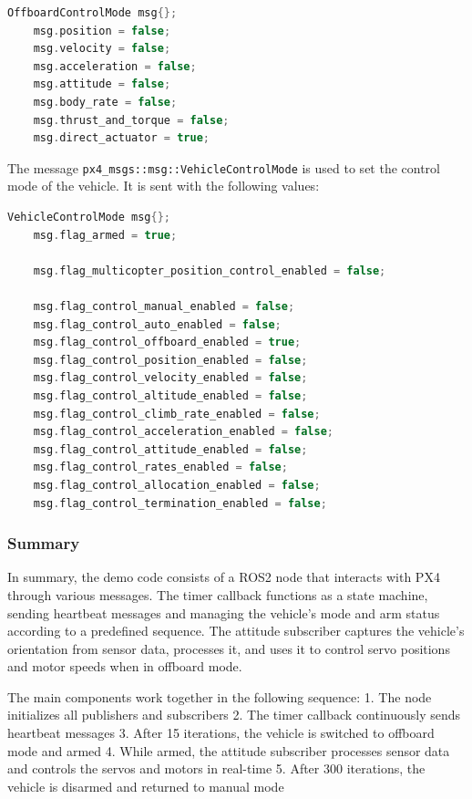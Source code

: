\documentclass[a4paper]{article}
\begin{document}
\begin{lstlisting}[language=C++, caption=OffboardControlMode message]
	OffboardControlMode msg{};
	msg.position = false;
	msg.velocity = false;
	msg.acceleration = false;
	msg.attitude = false;
	msg.body_rate = false;
	msg.thrust_and_torque = false;
	msg.direct_actuator = true;
\end{lstlisting}


The message \verb|px4_msgs::msg::VehicleControlMode| is used to set the control mode of the vehicle.
It is sent with the following values:

\begin{lstlisting}[language=C++, caption=VehicleControlMode message]
    VehicleControlMode msg{};
	msg.flag_armed = true;

	msg.flag_multicopter_position_control_enabled = false;

	msg.flag_control_manual_enabled = false;
	msg.flag_control_auto_enabled = false;
	msg.flag_control_offboard_enabled = true;
	msg.flag_control_position_enabled = false;
	msg.flag_control_velocity_enabled = false;
	msg.flag_control_altitude_enabled = false;
	msg.flag_control_climb_rate_enabled = false;
	msg.flag_control_acceleration_enabled = false;
	msg.flag_control_attitude_enabled = false;
	msg.flag_control_rates_enabled = false;
	msg.flag_control_allocation_enabled = false;
	msg.flag_control_termination_enabled = false;
\end{lstlisting}

\subsubsection{Summary}

In summary, the demo code consists of a ROS2 node that interacts with PX4 through various messages. The timer callback functions as a state machine, sending heartbeat messages and managing the vehicle's mode and arm status according to a predefined sequence. The attitude subscriber captures the vehicle's orientation from sensor data, processes it, and uses it to control servo positions and motor speeds when in offboard mode.

The main components work together in the following sequence:
1. The node initializes all publishers and subscribers
2. The timer callback continuously sends heartbeat messages
3. After 15 iterations, the vehicle is switched to offboard mode and armed
4. While armed, the attitude subscriber processes sensor data and controls the servos and motors in real-time
5. After 300 iterations, the vehicle is disarmed and returned to manual mode
\end{document}
